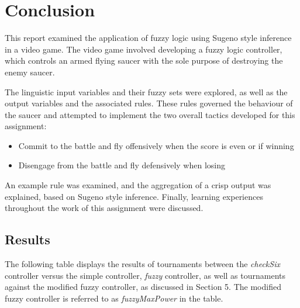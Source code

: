 \newpage

\section{Conclusion}

This report examined the application of fuzzy logic using Sugeno style inference in a video game. The video game involved developing a fuzzy logic controller, which controls an armed flying saucer with the sole purpose of destroying the enemy saucer.

The linguistic input variables and their fuzzy sets were explored, as well as the output variables and the associated rules. These rules governed the behaviour of the saucer and attempted to implement the two overall tactics developed for this assignment:

\begin{itemize}
	\item Commit to the battle and fly offensively when the score is even or if winning
	\item Disengage from the battle and fly defensively when losing
\end{itemize}

An example rule was examined, and the aggregation of a crisp output was explained, based on Sugeno style inference. Finally, learning experiences throughout the work of this assignment were discussed.

\subsection{Results}

The following table displays the results of tournaments between the \emph{checkSix} controller versus the simple controller, \emph{fuzzy} controller, as well as tournaments against the modified fuzzy controller, as discussed in Section 5. The modified fuzzy controller is referred to as \emph{fuzzyMaxPower} in the table.

